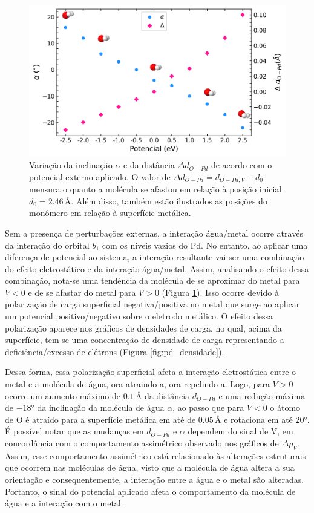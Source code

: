 \begin{figure}[h!]
	\centering
	\caption{Variação da inclinação $ \alpha $ e da distância $ \Delta d_{O-Pd} $ de acordo com o potencial externo aplicado. O valor de $ \Delta d_{O-Pd}=d_{O-Pd,V}-d_0 $ mensura o quanto a molécula se afastou em relação à posição inicial $ d_0=2.46\,\si{\angstrom} $. Além disso, também estão ilustrados as posições do monômero em relação à superfície metálica.}
	\label{fig:neq_pd_mon_geo}
	\includegraphics[scale=0.088]{figs/monomero_pd_ang.png}
\end{figure}

Sem a presença de perturbações externas, a interação água/metal ocorre através da interação do orbital $ b_1 $ com os níveis vazios do Pd. No entanto, ao aplicar uma diferença de potencial ao sistema, a interação resultante vai ser uma combinação do efeito eletrostático e da interação água/metal. Assim, analisando o efeito dessa combinação, nota-se uma tendência da molécula de se aproximar do metal para $ V<0 $ e de se afastar do metal para $ V>0 $ (Figura \ref{fig:neq_pd_mon_geo}). Isso ocorre devido à polarização de carga superficial negativa/positiva no metal que surge ao aplicar um potencial positivo/negativo sobre o eletrodo metálico. O efeito dessa polarização aparece nos gráficos de densidades de carga, no qual, acima da superfície, tem-se uma concentração de densidade de carga representando a deficiência/excesso de elétrons (Figura \ref{fig:pd_densidade}). 

Dessa forma, essa polarização superficial afeta a interação eletrostática entre o metal e a molécula de água, ora atraindo-a, ora repelindo-a. Logo, para $ V>0 $ ocorre um aumento máximo de $ 0.1\,\si{\angstrom} $ da distância $ d_{O-Pd} $ e uma redução máxima de $ -18\si{\degree} $ da inclinação da molécula de água $ \alpha $, ao passo que para $ V<0 $ o átomo de O é atraído para a superfície metálica em até de $ 0.05\,\si{\angstrom} $ e rotaciona em até $ 20\si{\degree} $. É possível notar que as mudanças em $d_{O-Pd}$ e $\alpha$ dependem do sinal de V, em concordância com o comportamento assimétrico observado nos gráficos de $\Delta\rho_{V}$. Assim, esse comportamento assimétrico está relacionado às alterações estruturais que ocorrem nas moléculas de água, visto que a molécula de água altera a sua orientação e consequentemente, a interação entre a água e o metal são alteradas. Portanto, o sinal do potencial aplicado afeta o comportamento da molécula de água e a interação com o metal.

